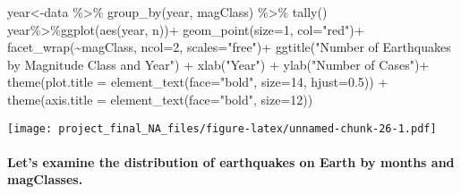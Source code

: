 \documentclass[
]{article}
\newenvironment{Shaded}{\begin{snugshade}}{\end{snugshade}}
\newcommand{\AttributeTok}[1]{\textcolor[rgb]{0.77,0.63,0.00}{#1}}
\newcommand{\DecValTok}[1]{\textcolor[rgb]{0.00,0.00,0.81}{#1}}
\newcommand{\FloatTok}[1]{\textcolor[rgb]{0.00,0.00,0.81}{#1}}
\newcommand{\FunctionTok}[1]{\textcolor[rgb]{0.00,0.00,0.00}{#1}}
\newcommand{\NormalTok}[1]{#1}
\newcommand{\OtherTok}[1]{\textcolor[rgb]{0.56,0.35,0.01}{#1}}
\newcommand{\SpecialCharTok}[1]{\textcolor[rgb]{0.00,0.00,0.00}{#1}}
\newcommand{\StringTok}[1]{\textcolor[rgb]{0.31,0.60,0.02}{#1}}
\begin{document}
\begin{Shaded}
\begin{Highlighting}[]
\NormalTok{year}\OtherTok{\textless{}{-}}\NormalTok{data }\SpecialCharTok{\%\textgreater{}\%} \FunctionTok{group\_by}\NormalTok{(year, magClass) }\SpecialCharTok{\%\textgreater{}\%} \FunctionTok{tally}\NormalTok{()}
\NormalTok{year}\SpecialCharTok{\%\textgreater{}\%}\FunctionTok{ggplot}\NormalTok{(}\FunctionTok{aes}\NormalTok{(year, n))}\SpecialCharTok{+}
\FunctionTok{geom\_point}\NormalTok{(}\AttributeTok{size=}\DecValTok{1}\NormalTok{, }\AttributeTok{col=}\StringTok{"red"}\NormalTok{)}\SpecialCharTok{+}
  \FunctionTok{facet\_wrap}\NormalTok{(}\SpecialCharTok{\textasciitilde{}}\NormalTok{magClass,  }\AttributeTok{ncol=}\DecValTok{2}\NormalTok{, }\AttributeTok{scales=}\StringTok{"free"}\NormalTok{)}\SpecialCharTok{+}
   \FunctionTok{ggtitle}\NormalTok{(}\StringTok{"Number of Earthquakes by Magnitude Class and Year"}\NormalTok{) }\SpecialCharTok{+}
           \FunctionTok{xlab}\NormalTok{(}\StringTok{"Year"}\NormalTok{) }\SpecialCharTok{+} \FunctionTok{ylab}\NormalTok{(}\StringTok{"Number of Cases"}\NormalTok{)}\SpecialCharTok{+}
  \FunctionTok{theme}\NormalTok{(}\AttributeTok{plot.title =} \FunctionTok{element\_text}\NormalTok{(}\AttributeTok{face=}\StringTok{"bold"}\NormalTok{, }\AttributeTok{size=}\DecValTok{14}\NormalTok{, }\AttributeTok{hjust=}\FloatTok{0.5}\NormalTok{)) }\SpecialCharTok{+}
\FunctionTok{theme}\NormalTok{(}\AttributeTok{axis.title =} \FunctionTok{element\_text}\NormalTok{(}\AttributeTok{face=}\StringTok{"bold"}\NormalTok{, }\AttributeTok{size=}\DecValTok{12}\NormalTok{))}
\end{Highlighting}
\end{Shaded}

\texttt{[image: project\_final\_NA\_files/figure-latex/unnamed-chunk-26-1.pdf]}

\hypertarget{lets-examine-the-distribution-of-earthquakes-on-earth-by-months-and-magclasses.}{%
\paragraph{Let's examine the distribution of earthquakes on Earth by
months and
magClasses.}\label{lets-examine-the-distribution-of-earthquakes-on-earth-by-months-and-magclasses.}}
\end{document}
